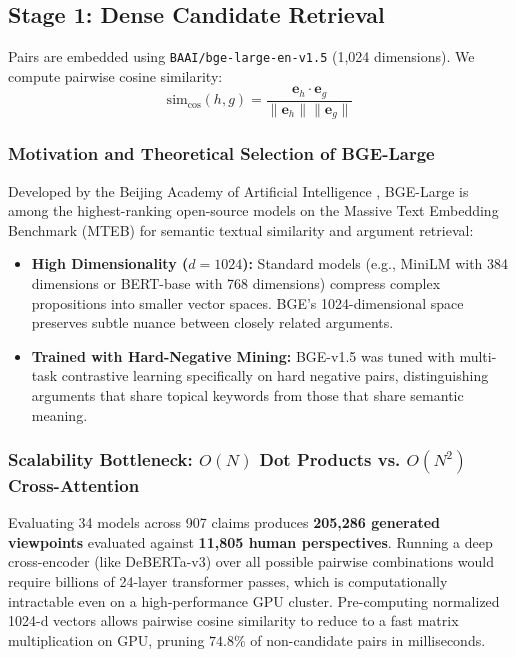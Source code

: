 \documentclass[11pt,a4paper]{article}
\begin{document}
\subsection{Stage 1: Dense Candidate Retrieval}
\label{subsec:stage1}
Pairs are embedded using \texttt{BAAI/bge-large-en-v1.5} (1,024 dimensions). We compute pairwise cosine similarity:
\begin{equation}
\text{sim}_{\text{cos}}(h, g) = \frac{\mathbf{e}_h \cdot \mathbf{e}_g}{\|\mathbf{e}_h\| \|\mathbf{e}_g\|}
\end{equation}

\subsubsection{Motivation and Theoretical Selection of BGE-Large}
Developed by the Beijing Academy of Artificial Intelligence \citep{xiao2023bge}, BGE-Large is among the highest-ranking open-source models on the Massive Text Embedding Benchmark (MTEB) for semantic textual similarity and argument retrieval:
\begin{itemize}[leftmargin=*,itemsep=1pt]
    \item \textbf{High Dimensionality ($d = 1024$):} Standard models (e.g., MiniLM with 384 dimensions or BERT-base with 768 dimensions) compress complex propositions into smaller vector spaces. BGE's 1024-dimensional space preserves subtle nuance between closely related arguments.
    \item \textbf{Trained with Hard-Negative Mining:} BGE-v1.5 was tuned with multi-task contrastive learning specifically on hard negative pairs, distinguishing arguments that share topical keywords from those that share semantic meaning.
\end{itemize}

\subsubsection{Scalability Bottleneck: $O(N)$ Dot Products vs. $O(N^2)$ Cross-Attention}
Evaluating 34 models across 907 claims produces \textbf{205,286 generated viewpoints} evaluated against \textbf{11,805 human perspectives}. Running a deep cross-encoder (like DeBERTa-v3) over all possible pairwise combinations would require billions of 24-layer transformer passes, which is computationally intractable even on a high-performance GPU cluster. Pre-computing normalized 1024-d vectors allows pairwise cosine similarity to reduce to a fast matrix multiplication on GPU, pruning $74.8\%$ of non-candidate pairs in milliseconds.
\end{document}
